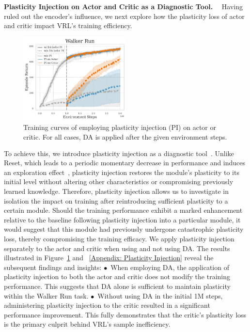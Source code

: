 \textbf{Plasticity Injection on Actor and Critic as a Diagnostic Tool.}~~
Having ruled out the encoder's influence, we next explore how the plasticity loss of actor and critic impact VRL's training efficiency.

\begin{figure}
  \vspace{-0.5\baselineskip}  
  \includegraphics[width=0.5\textwidth]{Figures/2Modules/Injection_WR.pdf}
  \vspace{-1.5\baselineskip}
  \caption{Training curves of employing plasticity injection (PI) on actor or critic. For all cases, DA is applied after the given environment steps.}
  \label{fig:injection}
\end{figure}
To achieve this, we introduce plasticity injection as a diagnostic tool~\citep{Plasticity_Injection}.
Unlike Reset, which leads to a periodic momentary decrease in performance and induces an exploration effect~\citep{primacy_bias}, plasticity injection restores the module's plasticity to its initial level without altering other characteristics or compromising previously learned knowledge.
Therefore, plasticity injection allows us to investigate in isolation the impact on training after reintroducing sufficient plasticity to a certain module.
Should the training performance exhibit a marked enhancement relative to the baseline following plasticity injection into a particular module, it would suggest that this module had previously undergone catastrophic plasticity loss, thereby compromising the training efficacy.
We apply plasticity injection separately to the actor and critic when using and not using DA.
The results illustrated in Figure~\ref{fig:injection} and \Appendix~\ref{Appendix: Plasticity Injection} reveal the subsequent findings and insights:
\textcolor{mydarkgreen}{$\bullet$}~When employing DA, the application of plasticity injection to both the actor and critic does not modify the training performance. This suggests that DA alone is sufficient to maintain plasticity within the Walker Run task.
\textcolor{mydarkgreen}{$\bullet$}~Without using DA in the initial 1M steps, administering plasticity injection to the critic resulted in a significant performance improvement. This fully demonstrates that the critic's plasticity loss is the primary culprit behind VRL's sample inefficiency.
